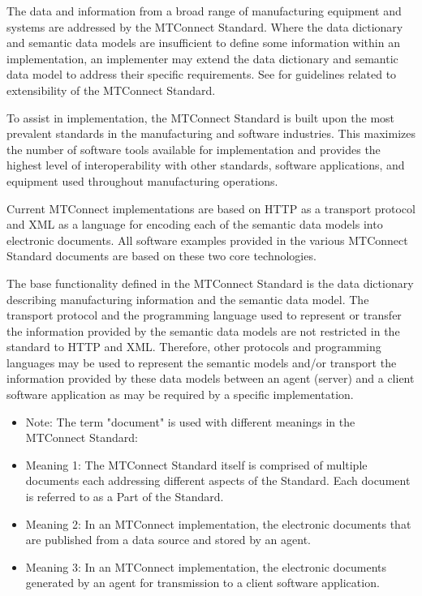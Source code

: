 The data and information from a broad range of manufacturing equipment and systems are addressed by the MTConnect Standard.  Where the \gls{data dictionary} and \glspl{semantic data model} are insufficient to define some information within an implementation, an implementer may extend the \gls{data dictionary} and \gls{semantic data model} to address their specific requirements.  See  for guidelines related to extensibility of the MTConnect Standard.

To assist in implementation, the MTConnect Standard is built upon the most prevalent standards in the manufacturing and software industries.  This maximizes the number of software tools available for implementation and provides the highest level of interoperability with other standards, software applications, and equipment used throughout manufacturing operations.  

Current MTConnect implementations are based on HTTP as a transport protocol and XML as a language for encoding each of the \glspl{semantic data model} into electronic documents.  All software examples provided in the various MTConnect Standard documents are based on these two core technologies.  

The base functionality defined in the MTConnect Standard is the \gls{data dictionary} describing manufacturing information and the \gls{semantic data model}.  The transport protocol and the programming language used to represent or transfer the information provided by the \glspl{semantic data model} are not restricted in the standard to HTTP and XML.  Therefore, other protocols and programming languages may be used to represent the semantic models and/or transport the information provided by these data models between an \gls{agent} (server) and a client software application as may be required by a specific implementation.


\begin{itemize}
    \item Note: The term "document" is used with different meanings in the MTConnect Standard:

    \item Meaning 1:  The MTConnect Standard itself is comprised of multiple documents each addressing different aspects of the Standard.  Each document is referred to as a Part of the Standard.

    \item Meaning 2:  In an MTConnect implementation, the electronic documents that are published from a data source and stored by an \gls{agent}.     

    \item Meaning 3:  In an MTConnect implementation, the electronic documents generated by an \gls{agent} for transmission to a client software application. 

\end{itemize}

